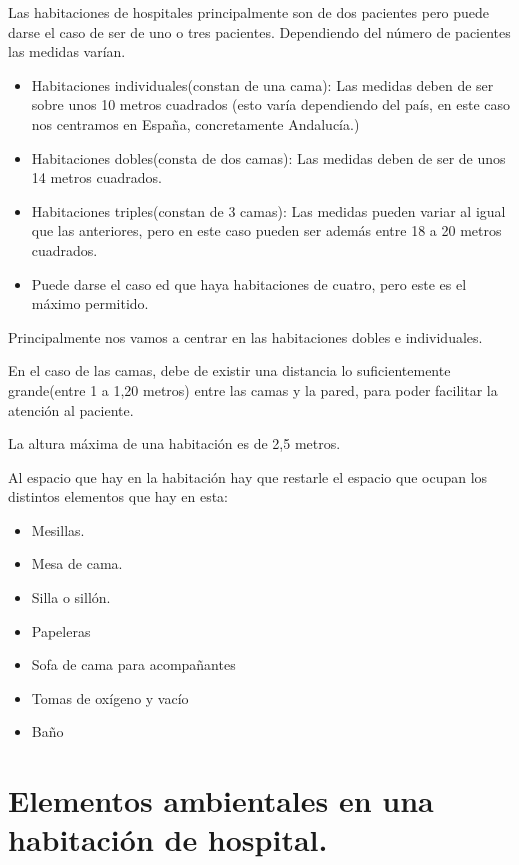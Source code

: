 \documentclass[a4paper]{article}
\begin{document}
Las habitaciones de hospitales principalmente son de dos pacientes pero puede darse el caso de ser de uno o tres pacientes. Dependiendo del número de pacientes las medidas varían.

\begin{itemize}
	\item Habitaciones individuales(constan de una cama): Las medidas deben de ser sobre unos 10 metros cuadrados (esto varía dependiendo del país, en este caso nos centramos en España, concretamente Andalucía.)
	\item Habitaciones dobles(consta de dos camas): Las medidas deben de ser de unos 14 metros cuadrados.
	\item Habitaciones triples(constan de 3 camas): Las medidas pueden variar al igual que las anteriores, pero en este caso pueden ser además entre 18 a 20 metros cuadrados.
	
 \item Puede darse el caso ed que haya habitaciones de cuatro, pero este es el máximo permitido.
 
\end{itemize} 
Principalmente nos vamos a centrar en las habitaciones dobles e individuales.

En el caso de las camas, debe de existir una distancia lo suficientemente grande(entre 1 a 1,20 metros) entre las camas y la pared, para poder facilitar la atención al paciente.

La altura máxima de una habitación es de 2,5 metros.

Al espacio que hay en la habitación hay que restarle el espacio que ocupan los distintos elementos que hay en esta:

\begin{itemize}
	\item Mesillas.
	\item Mesa de cama.
	\item Silla o sillón.
	\item Papeleras
	\item Sofa de cama para acompañantes
	\item Tomas de oxígeno y vacío
	\item Baño
\end{itemize}

\clearpage

\section{Elementos ambientales en una habitación de hospital.}
\end{document}
